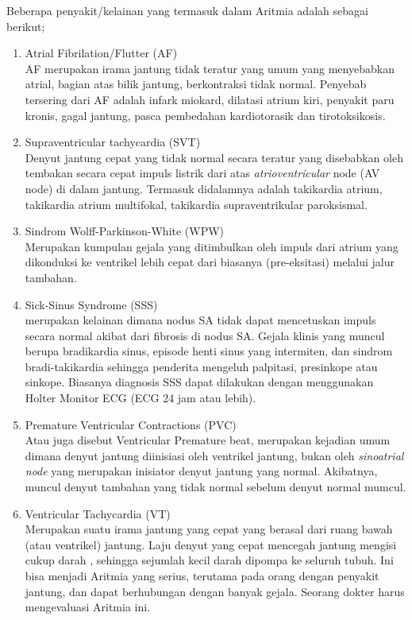 Beberapa penyakit/kelainan yang termasuk dalam Aritmia adalah sebagai
berikut;
\begin{enumerate}
  \item Atrial Fibrilation/Flutter (AF) \\
  AF merupakan irama jantung tidak teratur yang umum yang menyebabkan atrial,
  bagian atas bilik jantung, berkontraksi tidak normal. Penyebab tersering dari
  AF adalah infark miokard, dilatasi atrium kiri, penyakit paru kronis, gagal
  jantung, pasca pembedahan kardiotorasik dan tirotoksikosis.
  
  \item Supraventricular tachycardia (SVT) \\
  Denyut jantung cepat yang	tidak  normal secara teratur yang disebabkan oleh
  tembakan secara cepat impuls listrik  dari atas \textit{atrioventricular} node
  (AV node) di dalam jantung. Termasuk didalamnya adalah takikardia atrium,
  takikardia atrium multifokal, takikardia supraventrikular paroksismal.

  \item Sindrom Wolff-Parkinson-White (WPW) \\
  Merupakan kumpulan gejala yang ditimbulkan oleh impuls dari atrium yang
  dikonduksi ke ventrikel lebih cepat dari biasanya (pre-eksitasi) melalui jalur
  tambahan.

  \item Sick-Sinus Syndrome (SSS) \\
  merupakan kelainan dimana nodus SA tidak dapat mencetuskan impuls secara
  normal akibat dari fibrosis di nodus SA. Gejala klinis yang muncul berupa
  bradikardia sinus, episode henti sinus yang intermiten, dan sindrom
  bradi-takikardia sehingga penderita mengeluh palpitasi, presinkope atau
  sinkope. Biasanya diagnosis SSS dapat dilakukan dengan menggunakan Holter
  Monitor ECG (ECG 24 jam atau lebih).
  
  \item Premature Ventricular Contractions (PVC) \\
  Atau juga disebut Ventricular Premature beat, merupakan kejadian umum  dimana
  denyut jantung diinisiasi oleh ventrikel jantung,   bukan  oleh
  \textit{sinoatrial node} yang merupakan  inisiator denyut jantung yang normal.
  Akibatnya, muncul denyut tambahan yang tidak normal sebelum denyut normal
  mumcul.

  \item Ventricular Tachycardia (VT) \\
  Merupakan suatu irama jantung yang cepat yang berasal dari ruang bawah (atau
  ventrikel) jantung. Laju denyut yang cepat mencegah jantung mengisi cukup
  darah , sehingga sejumlah kecil darah dipompa ke seluruh tubuh. Ini bisa
  menjadi Aritmia yang serius,  terutama pada orang dengan penyakit
  jantung, dan dapat berhubungan dengan banyak  gejala. Seorang dokter harus
  mengevaluasi Aritmia ini.
		

\end{enumerate}
